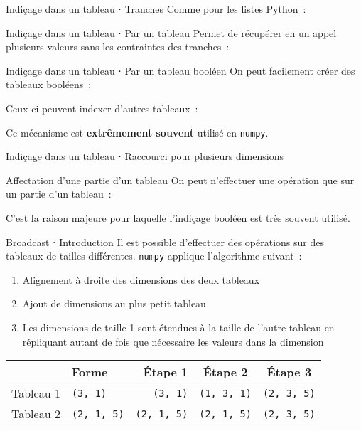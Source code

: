 \begin{frame}{Indiçage dans un tableau ⋅ Tranches}
  Comme pour les listes Python~:
\end{frame}

\begin{frame}{Indiçage dans un tableau ⋅ Par un tableau}
  Permet de récupérer en un appel plusieurs valeurs sans les contraintes des tranches~:
\end{frame}

\begin{frame}{Indiçage dans un tableau ⋅ Par un tableau booléen}
  On peut facilement créer des tableaux booléens~:

  Ceux-ci peuvent indexer d'autres tableaux~:

  Ce mécanisme est \textbf{extrêmement souvent} utilisé en \texttt{numpy}.
\end{frame}

\begin{frame}{Indiçage dans un tableau ⋅ Raccourci pour plusieurs dimensions}
\end{frame}

\begin{frame}{Affectation d'une partie d'un tableau}
  On peut n'effectuer une opération que sur un partie d'un tableau~:

  C'est la raison majeure pour laquelle l'indiçage booléen est très souvent utilisé.
\end{frame}

\begin{frame}{Broadcast ⋅ Introduction}
  Il est possible d'effectuer des opérations sur des tableaux de tailles différentes.
  \texttt{numpy} applique l'algorithme suivant~:
  \begin{enumerate}
    \item Alignement à droite des dimensions des deux tableaux
    \item Ajout de dimensions au plus petit tableau
    \item Les dimensions de taille 1 sont étendues à la taille de l'autre tableau en répliquant autant de fois que nécessaire les valeurs dans la dimension
  \end{enumerate}
  \begin{tabular}{clrcc}
    \toprule
    & Forme & Étape 1 & Étape 2 & Étape 3 \\
    \midrule
    Tableau 1 & \texttt{(3, 1)} & \texttt{(3, 1)} & \texttt{(1, 3, 1)} & \texttt{(2, 3, 5)} \\
    Tableau 2 & \texttt{(2, 1, 5)} & \texttt{(2, 1, 5)} & \texttt{(2, 1, 5)} & \texttt{(2, 3, 5)} \\
    \bottomrule
  \end{tabular}
\end{frame}

